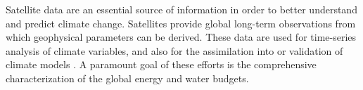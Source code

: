 
\introduction


Satellite data are an essential source of information in order to
better understand and predict climate change. Satellites provide global long-term
observations from which geophysical parameters can be derived. These data are used for
time-series analysis of climate variables, and also for the assimilation into
or validation of climate models \citep{Comiso14,Yang13}. A paramount goal of
these efforts is the comprehensive characterization of the global energy and
water budgets.

